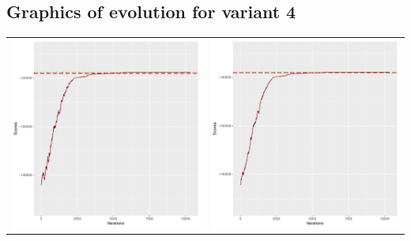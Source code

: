 \documentclass[]{scrartcl}
\begin{document}
\clearpage

\subsection{Graphics of evolution for variant 4}

\begin{table}[h!]
\begin{tabular}{cc}
\includegraphics[scale = 0.4]{./figs/hepar2/v4/25/boundsEvolution-10352.pdf} & 
\includegraphics[scale = 0.4]{./figs/hepar2/v4/50/boundsEvolution-10352.pdf} \\

\end{tabular}
\end{table}
\end{document}
